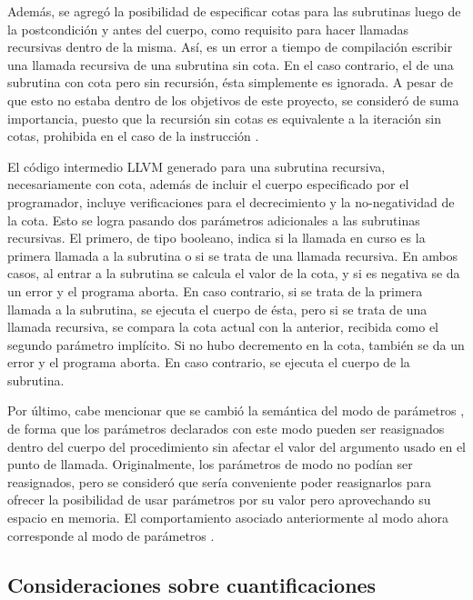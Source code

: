 Además, se agregó la posibilidad de especificar cotas para las subrutinas luego
de la postcondición y antes del cuerpo, como requisito para hacer llamadas
recursivas dentro de la misma. Así, es un error a tiempo de compilación escribir
una llamada recursiva de una subrutina sin cota. En el caso contrario, el de una
subrutina con cota pero sin recursión, ésta simplemente es ignorada. A pesar de
que esto no estaba dentro de los objetivos de este proyecto, se consideró de
suma importancia, puesto que la recursión sin cotas es equivalente a la
iteración sin cotas, prohibida en el caso de la instrucción .

El código intermedio LLVM generado para una subrutina recursiva, necesariamente
con cota, además de incluir el cuerpo especificado por el programador, incluye
verificaciones para el decrecimiento y la no-negatividad de la cota. Esto se
logra pasando dos parámetros adicionales a las subrutinas recursivas. El
primero, de tipo booleano, indica si la llamada en curso es la primera llamada a
la subrutina o si se trata de una llamada recursiva. En ambos casos, al entrar a
la subrutina se calcula el valor de la cota, y si es negativa se da un error y
el programa aborta. En caso contrario, si se trata de la primera llamada a la
subrutina, se ejecuta el cuerpo de ésta, pero si se trata de una llamada
recursiva, se compara la cota actual con la anterior, recibida como el segundo
parámetro implícito. Si no hubo decremento en la cota, también se da un error y
el programa aborta. En caso contrario, se ejecuta el cuerpo de la subrutina.

Por último, cabe mencionar que se cambió la semántica del modo de parámetros
, de forma que los parámetros declarados con este modo pueden ser
reasignados dentro del cuerpo del procedimiento sin afectar el valor del
argumento usado en el punto de llamada. Originalmente, los parámetros de modo
 no podían ser reasignados, pero se consideró que sería conveniente
poder reasignarlos para ofrecer la posibilidad de usar parámetros por su valor
pero aprovechando su espacio en memoria. El comportamiento asociado
anteriormente al modo  ahora corresponde al modo de parámetros
.

\subsection{Consideraciones sobre cuantificaciones}

